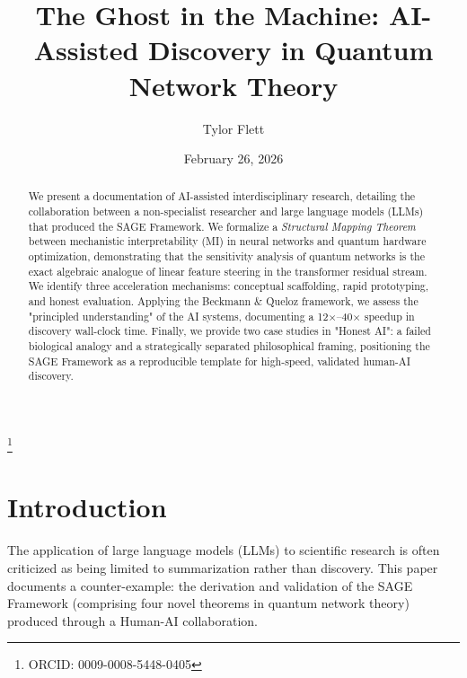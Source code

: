 \documentclass[aps,pra,reprint,amsmath,amssymb,superscriptaddress]{revtex4-2}
\begin{document}
\title{The Ghost in the Machine: AI-Assisted Discovery in Quantum\\
Network Theory}

\author{Tylor Flett}
\thanks{ORCID: 0009-0008-5448-0405}

\date{February 26, 2026}

\begin{abstract}
We present a documentation of AI-assisted interdisciplinary research, detailing the collaboration between a non-specialist researcher and large language models (LLMs) that produced the SAGE Framework. We formalize a \emph{Structural Mapping Theorem} between mechanistic interpretability (MI) in neural networks and quantum hardware optimization, demonstrating that the sensitivity analysis of quantum networks is the exact algebraic analogue of linear feature steering in the transformer residual stream. We identify three acceleration mechanisms: conceptual scaffolding, rapid prototyping, and honest evaluation. Applying the Beckmann \& Queloz framework, we assess the "principled understanding" of the AI systems, documenting a 12$\times$--40$\times$ speedup in discovery wall-clock time. Finally, we provide two case studies in "Honest AI": a failed biological analogy and a strategically separated philosophical framing, positioning the SAGE Framework as a reproducible template for high-speed, validated human-AI discovery.
\end{abstract}

\maketitle


\section{Introduction}

The application of large language models (LLMs) to scientific research is often criticized as being limited to summarization rather than discovery. This paper documents a counter-example: the derivation and validation of the SAGE Framework (comprising four novel theorems in quantum network theory) produced through a Human-AI collaboration.
\end{document}
